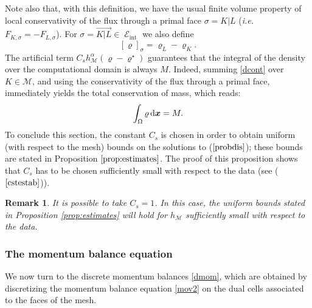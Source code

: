\documentclass{amsart}
\newtheorem{rmq}{Remark}
\numberwithin{equation}{section}
\begin{document}
\medskip
Note also that, with this definition, we have the usual finite volume property of local conservativity of the flux through a primal face  
${{\sigma}}=K|L$ ({\emph{i.e.\/}} \ $F_{K,{{\sigma}}}=-F_{L,{{\sigma}}}$). For $ {{\sigma}} =\overrightarrow{K \vert L} \in \operatorname{{\mathcal{E}}}_\operatorname{int} $ we also define
\begin{equation}\label{gap}
[{\varrho}]_{{\sigma}} = {\varrho}_L-{\varrho}_K.
\end{equation}
The artificial term ${C_s} h_{{\mathcal M}}^\alpha ( {\varrho}- {\varrho}^\star)$ guarantees that the integral of the density over the computational domain is always $M$.
Indeed, summing \eqref{dcont} over $K \in {{\mathcal M}}$, and using  the conservativity of the flux through a primal face, immediately yields the total conservation of mass, which reads:
\begin{equation}\label{masscons}
	 \int_\Omega {\varrho} {\, {\rm d}{{\boldsymbol x}}} = M.
\end{equation}
To conclude this section, the constant ${C_s}$ is chosen in order to obtain uniform (with respect to the mesh) bounds on the solutions to ($\ref{probdis}$); these bounds are stated in Proposition $\ref{prop:estimates}$. The proof of this proposition shows that ${C_s}$ has to be chosen sufficiently small with respect to the data (see ($\ref{cstestab}$)).

\begin{rmq}
It is possible to take ${C_s}=1$. In this case, the uniform bounds stated in Proposition \ref{prop:estimates} will hold for $h_{{\mathcal M}} $ sufficiently small with respect to the data.
\end{rmq}
\subsubsection{The momentum balance equation}

We now turn to the discrete momentum balances \eqref{dmom}, which are obtained by discretizing the momentum balance equation \eqref{mov2} on the dual cells associated to the faces of the mesh.
\end{document}
